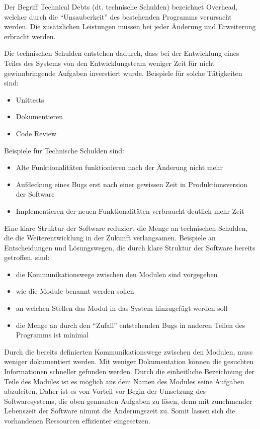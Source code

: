 Der Begriff Technical Debts (dt. technische Schulden) bezeichnet Overhead, 
welcher durch die ``Unsauberkeit'' des bestehenden Programms verursacht werden.
Die zusätzlichen Leistungen müssen bei jeder Änderung und Erweiterung erbracht werden.

Die technischen Schulden entstehen dadurch, dass bei der Entwicklung eines Teiles des Systems
von den Entwicklungsteam weniger Zeit für nicht gewinnbringende Aufgaben inverstiert wurde.
Beispiele für solche Tätigkeiten sind:
\begin{itemize}
    \item Unittests
    \item Dokumentieren 
    \item Code Review
\end{itemize}

Beispiele für Technische Schulden sind:
\begin{itemize}
    \item Alte Funktionalitäten funktionieren nach der Änderung nicht mehr
    \item Aufdeckung eines Bugs erst nach einer gewissen Zeit in Produktionsversion der Software
    \item Implementieren der neuen Funktionalitäten verbraucht deutlich mehr Zeit
\end{itemize}

Eine klare Struktur der Software reduziert die Menge an technischen Schulden, 
die die Weiterentwicklung in der Zukunft verlangsamen. 
Beispiele an Entscheidungen und Lösungswegen, 
die durch klare Struktur der Software bereits getroffen, sind:

\begin{itemize}
    \item die Kommunikationswege zwischen den Modulen sind vorgegeben
    \item wie die Module benannt werden sollen
    \item an welchen Stellen das Modul in das System hinzugefügt werden soll
    \item die Menge an durch den ``Zufall'' entstehenden Bugs in anderen Teilen des Programms ist minimal
\end{itemize}

Durch die bereits definierten Kommunikationswege zwischen den Modulen, muss weniger dokumentiert werden.
Mit weniger Dokumentation können die gesuchten Informationen schneller gefunden werden.
Durch die einheitliche Bezeichnung der Teile des Modules ist es möglich aus dem Namen des Modules seine Aufgaben abzuleiten.
Daher ist es von Vorteil vor Begin der Umsetzung des Softwaresystems, die oben gennanten Aufgaben zu lösen,
denn mit zunehmender Lebenszeit der Software nimmt die Änderungszeit zu.
Somit lassen sich die vorhandenen Ressourcen effizienter eingesetzen.